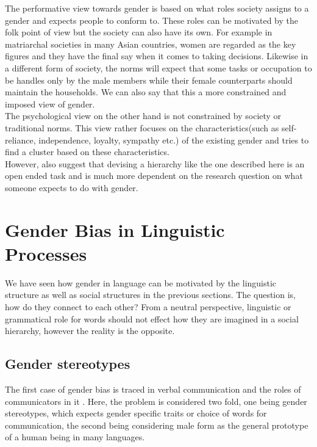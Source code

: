 \documentclass{article}
\begin{document}
\noindent
The performative view towards gender is based on what roles society assigns to a gender and expects people to conform to. These roles can be motivated by the folk point of view but the society can also have its own. For example in matriarchal societies in many Asian countries, women are regarded as the key figures and they have the final say when it comes to taking decisions. Likewise in a different form of society, the norms will expect that some tasks or occupation to be handles only by the male members while their female counterparts should maintain the households. We can also say that this a more constrained and imposed view of gender. \\

\noindent
The psychological view on the other hand is not constrained by society or traditional norms. This view rather focuses on the characteristics(such as self-reliance, independence, loyalty, sympathy etc.) of the existing gender and tries to find a cluster based on these characteristics. \\

\noindent
However, \cite{larson2017gender} also suggest that devising a hierarchy like the one described here is an open ended task and is much more dependent on the research question on what someone expects to do with gender. 

\section*{Gender Bias in Linguistic Processes}
We have seen how gender in language can be motivated by the linguistic structure as well as social structures in the previous sections. The question is, how do they connect to each other? From a neutral perspective, linguistic or grammatical role for words should not effect how they are imagined in a social hierarchy, however the reality is the opposite. \\

\subsection*{Gender stereotypes}
The first case of gender bias is traced in verbal communication and the roles of communicators in it \cite{menegatti2017gender}. Here, the problem is considered two fold, one being gender stereotypes, which expects gender specific traits or choice of words for communication, the second being considering male form as the general prototype of a human being in many languages. \\ 
\end{document}
